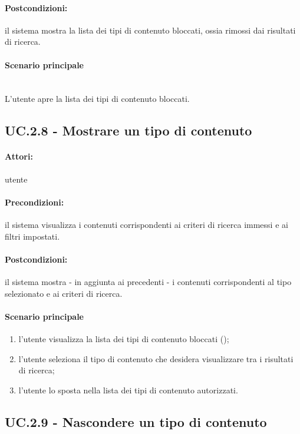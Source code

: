 \documentclass[10pt,a4paper,headinclude,footinclude,hidelinks]{scrreprt} %
\begin{document}
	\paragraph{Postcondizioni:} il sistema mostra la lista dei tipi di contenuto bloccati, ossia rimossi dai risultati di ricerca.
	\paragraph{Scenario principale} \hfill \\
	L'utente apre la lista dei tipi di contenuto bloccati.

	\subsection[UC.2.8]{UC.2.8 - Mostrare un tipo di contenuto}
	\label{sec:stage:ar:uc:2_8}
	\paragraph{Attori:} utente
	\paragraph{Precondizioni:} il sistema visualizza i contenuti corrispondenti ai criteri di ricerca immessi e ai filtri impostati.
	\paragraph{Postcondizioni:} il sistema mostra - in aggiunta ai precedenti - i contenuti corrispondenti al tipo selezionato e ai criteri di ricerca.
	\paragraph{Scenario principale}
	\begin{enumerate}
	\item l'utente visualizza la lista dei tipi di contenuto bloccati ();
	\item l'utente seleziona il tipo di contenuto che desidera visualizzare tra i risultati di ricerca;
	\item l'utente lo sposta nella lista dei tipi di contenuto autorizzati.
	\end{enumerate}

	\subsection[UC.2.9]{UC.2.9 - Nascondere un tipo di contenuto}
	\label{sec:stage:ar:uc:2_9}
\end{document}
